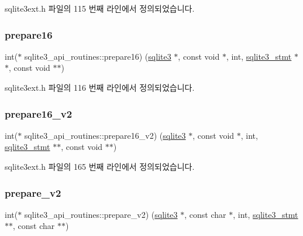 sqlite3ext.\+h 파일의 115 번째 라인에서 정의되었습니다.

\mbox{\label{structsqlite3__api__routines_a6f08b1665a9ac05e3b7fab0bd8adce32}} 
\subsubsection{\texorpdfstring{prepare16}{prepare16}}
{\footnotesize\ttfamily int($\ast$ sqlite3\+\_\+api\+\_\+routines\+::prepare16) (\hyperlink{sqlite3_8h_a0ef6f2646262c8a9b24368d8ac140f69}{sqlite3} $\ast$, const void $\ast$, int, \hyperlink{sqlite3_8h_af2a033da1327cdd77f0a174a09aedd0c}{sqlite3\+\_\+stmt} $\ast$$\ast$, const void $\ast$$\ast$)}



sqlite3ext.\+h 파일의 116 번째 라인에서 정의되었습니다.

\mbox{\label{structsqlite3__api__routines_a0efd64fdd8df6a3c49fcfbe2279a2fb9}} 
\subsubsection{\texorpdfstring{prepare16\+\_\+v2}{prepare16\_v2}}
{\footnotesize\ttfamily int($\ast$ sqlite3\+\_\+api\+\_\+routines\+::prepare16\+\_\+v2) (\hyperlink{sqlite3_8h_a0ef6f2646262c8a9b24368d8ac140f69}{sqlite3} $\ast$, const void $\ast$, int, \hyperlink{sqlite3_8h_af2a033da1327cdd77f0a174a09aedd0c}{sqlite3\+\_\+stmt} $\ast$$\ast$, const void $\ast$$\ast$)}



sqlite3ext.\+h 파일의 165 번째 라인에서 정의되었습니다.

\mbox{\label{structsqlite3__api__routines_aba67c71ba4ca3edf942ebe2c38ba93ad}} 
\subsubsection{\texorpdfstring{prepare\+\_\+v2}{prepare\_v2}}
{\footnotesize\ttfamily int($\ast$ sqlite3\+\_\+api\+\_\+routines\+::prepare\+\_\+v2) (\hyperlink{sqlite3_8h_a0ef6f2646262c8a9b24368d8ac140f69}{sqlite3} $\ast$, const char $\ast$, int, \hyperlink{sqlite3_8h_af2a033da1327cdd77f0a174a09aedd0c}{sqlite3\+\_\+stmt} $\ast$$\ast$, const char $\ast$$\ast$)}



